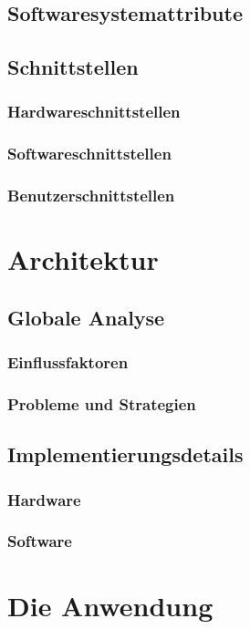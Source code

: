 \documentclass{Ausarbeitung}
\begin{document}
	\subsection{Softwaresystemattribute}
	\label{attribute}
	\subsection{Schnittstellen}
	\label{interfaces}
			\subsubsection{Hardwareschnittstellen}
			\label{hardwareI}
			\subsubsection{Softwareschnittstellen}
			\label{SoftwareI}
			\subsubsection{Benutzerschnittstellen}
			\label{userI}
\clearpage
\section{Architektur}
\label{architektur}
	\subsection{Globale Analyse}
	\label{globAnalyse}
		\subsubsection{Einflussfaktoren}
		\label{einfluss}
		\subsubsection{Probleme und Strategien}
		\label{probleme}
	\subsection{Implementierungsdetails}
	\label{details}
		\subsubsection{Hardware}
		\label{hardware}
		\subsubsection{Software}
		\label{software}
\clearpage
\section{Die Anwendung}
\label{anwendung}
\end{document}
